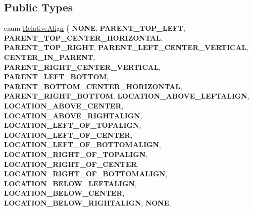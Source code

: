 \subsection*{Public Types}
\begin{DoxyCompactItemize}
\item 
enum \hyperlink{classui_1_1RelativeLayoutParameter_a40283d09524c58e61741de3288e6769d}{Relative\+Align} \{ \newline
{\bfseries N\+O\+NE}, 
{\bfseries P\+A\+R\+E\+N\+T\+\_\+\+T\+O\+P\+\_\+\+L\+E\+FT}, 
{\bfseries P\+A\+R\+E\+N\+T\+\_\+\+T\+O\+P\+\_\+\+C\+E\+N\+T\+E\+R\+\_\+\+H\+O\+R\+I\+Z\+O\+N\+T\+AL}, 
{\bfseries P\+A\+R\+E\+N\+T\+\_\+\+T\+O\+P\+\_\+\+R\+I\+G\+HT}, 
\newline
{\bfseries P\+A\+R\+E\+N\+T\+\_\+\+L\+E\+F\+T\+\_\+\+C\+E\+N\+T\+E\+R\+\_\+\+V\+E\+R\+T\+I\+C\+AL}, 
{\bfseries C\+E\+N\+T\+E\+R\+\_\+\+I\+N\+\_\+\+P\+A\+R\+E\+NT}, 
{\bfseries P\+A\+R\+E\+N\+T\+\_\+\+R\+I\+G\+H\+T\+\_\+\+C\+E\+N\+T\+E\+R\+\_\+\+V\+E\+R\+T\+I\+C\+AL}, 
{\bfseries P\+A\+R\+E\+N\+T\+\_\+\+L\+E\+F\+T\+\_\+\+B\+O\+T\+T\+OM}, 
\newline
{\bfseries P\+A\+R\+E\+N\+T\+\_\+\+B\+O\+T\+T\+O\+M\+\_\+\+C\+E\+N\+T\+E\+R\+\_\+\+H\+O\+R\+I\+Z\+O\+N\+T\+AL}, 
{\bfseries P\+A\+R\+E\+N\+T\+\_\+\+R\+I\+G\+H\+T\+\_\+\+B\+O\+T\+T\+OM}, 
{\bfseries L\+O\+C\+A\+T\+I\+O\+N\+\_\+\+A\+B\+O\+V\+E\+\_\+\+L\+E\+F\+T\+A\+L\+I\+GN}, 
{\bfseries L\+O\+C\+A\+T\+I\+O\+N\+\_\+\+A\+B\+O\+V\+E\+\_\+\+C\+E\+N\+T\+ER}, 
\newline
{\bfseries L\+O\+C\+A\+T\+I\+O\+N\+\_\+\+A\+B\+O\+V\+E\+\_\+\+R\+I\+G\+H\+T\+A\+L\+I\+GN}, 
{\bfseries L\+O\+C\+A\+T\+I\+O\+N\+\_\+\+L\+E\+F\+T\+\_\+\+O\+F\+\_\+\+T\+O\+P\+A\+L\+I\+GN}, 
{\bfseries L\+O\+C\+A\+T\+I\+O\+N\+\_\+\+L\+E\+F\+T\+\_\+\+O\+F\+\_\+\+C\+E\+N\+T\+ER}, 
{\bfseries L\+O\+C\+A\+T\+I\+O\+N\+\_\+\+L\+E\+F\+T\+\_\+\+O\+F\+\_\+\+B\+O\+T\+T\+O\+M\+A\+L\+I\+GN}, 
\newline
{\bfseries L\+O\+C\+A\+T\+I\+O\+N\+\_\+\+R\+I\+G\+H\+T\+\_\+\+O\+F\+\_\+\+T\+O\+P\+A\+L\+I\+GN}, 
{\bfseries L\+O\+C\+A\+T\+I\+O\+N\+\_\+\+R\+I\+G\+H\+T\+\_\+\+O\+F\+\_\+\+C\+E\+N\+T\+ER}, 
{\bfseries L\+O\+C\+A\+T\+I\+O\+N\+\_\+\+R\+I\+G\+H\+T\+\_\+\+O\+F\+\_\+\+B\+O\+T\+T\+O\+M\+A\+L\+I\+GN}, 
{\bfseries L\+O\+C\+A\+T\+I\+O\+N\+\_\+\+B\+E\+L\+O\+W\+\_\+\+L\+E\+F\+T\+A\+L\+I\+GN}, 
\newline
{\bfseries L\+O\+C\+A\+T\+I\+O\+N\+\_\+\+B\+E\+L\+O\+W\+\_\+\+C\+E\+N\+T\+ER}, 
{\bfseries L\+O\+C\+A\+T\+I\+O\+N\+\_\+\+B\+E\+L\+O\+W\+\_\+\+R\+I\+G\+H\+T\+A\+L\+I\+GN}, 
{\bfseries N\+O\+NE}, 

\end{DoxyCompactItemize}
